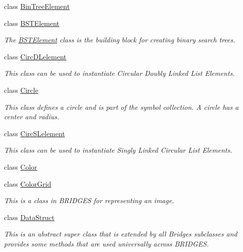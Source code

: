 \begin{DoxyCompactItemize}
class \mbox{\hyperlink{classbridges_1_1base_1_1_bin_tree_element}{Bin\+Tree\+Element}}
\item 
class \mbox{\hyperlink{classbridges_1_1base_1_1_b_s_t_element}{B\+S\+T\+Element}}
\begin{DoxyCompactList}\small\item\em The \mbox{\hyperlink{classbridges_1_1base_1_1_b_s_t_element}{B\+S\+T\+Element}} class is the building block for creating binary search trees. \end{DoxyCompactList}\item 
class \mbox{\hyperlink{classbridges_1_1base_1_1_circ_d_lelement}{Circ\+D\+Lelement}}
\begin{DoxyCompactList}\small\item\em This class can be used to instantiate Circular Doubly Linked List Elements. \end{DoxyCompactList}\item 
class \mbox{\hyperlink{classbridges_1_1base_1_1_circle}{Circle}}
\begin{DoxyCompactList}\small\item\em This class defines a circle and is part of the symbol collection. A circle has a center and radius. \end{DoxyCompactList}\item 
class \mbox{\hyperlink{classbridges_1_1base_1_1_circ_s_lelement}{Circ\+S\+Lelement}}
\begin{DoxyCompactList}\small\item\em This class can be used to instantiate Singly Linked Circular List Elements. \end{DoxyCompactList}\item 
class \mbox{\hyperlink{classbridges_1_1base_1_1_color}{Color}}
\item 
class \mbox{\hyperlink{classbridges_1_1base_1_1_color_grid}{Color\+Grid}}
\begin{DoxyCompactList}\small\item\em This is a class in B\+R\+I\+D\+G\+ES for representing an image. \end{DoxyCompactList}\item 
class \mbox{\hyperlink{classbridges_1_1base_1_1_data_struct}{Data\+Struct}}
\begin{DoxyCompactList}\small\item\em This is an abstract super class that is extended by all Bridges subclasses and provides some methods that are used universally across B\+R\+I\+D\+G\+ES. \end{DoxyCompactList}\item 

\end{DoxyCompactItemize}
